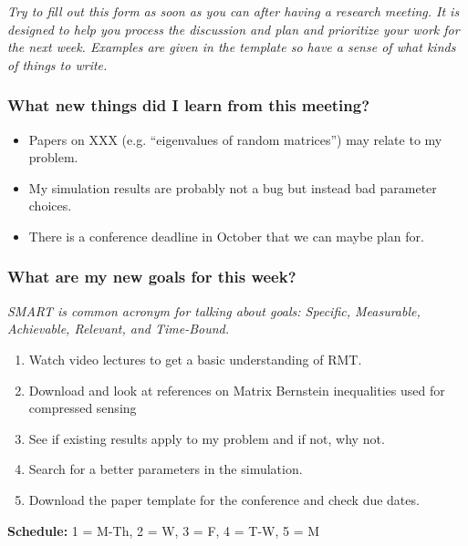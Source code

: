 \documentclass[10pt, letter]{article}
\begin{document}

\noindent \textit{Try to fill out this form as soon as you can after having a research meeting. It is designed to help you process the discussion and plan and prioritize your work for the next week. Examples are given in the template so have a sense of what kinds of things to write.}


\subsubsection*{What new things did I learn from this meeting?}

\begin{note}
\begin{itemize}
\item Papers on XXX (e.g. ``eigenvalues of random matrices'') may relate to my problem.
\item My simulation results are probably not a bug but instead bad parameter choices.
\item There is a conference deadline in October that we can maybe plan for.
\end{itemize}
\end{note}


\subsubsection*{What are my new goals for this week?}

\textit{SMART is common acronym for talking about goals: Specific, Measurable, Achievable, Relevant, and Time-Bound.}

\begin{note}
	\begin{enumerate}
	\item Watch video lectures to get a basic understanding of RMT.
	\item Download and look at references on Matrix Bernstein inequalities used for compressed sensing 
	\item See if existing results apply to my problem and if not, why not.
	\item Search for a better parameters in the simulation.
	\item Download the paper template for the conference and check due dates.
	\end{enumerate}
\textbf{Schedule:} 1 = M-Th, 2 = W, 3 = F, 4 = T-W, 5 = M
\end{note}
\end{document}
